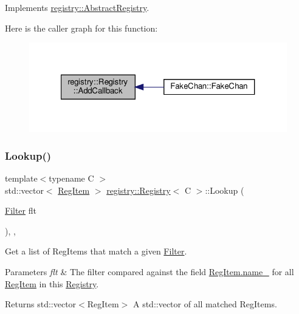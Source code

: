 Implements \hyperlink{classregistry_1_1AbstractRegistry_a83f61ca483c22185ddf43653ca65a8ef}{registry\+::\+Abstract\+Registry}.

Here is the caller graph for this function\+:\nopagebreak
\begin{figure}[H]
\begin{center}
\leavevmode
\includegraphics[width=321pt]{classregistry_1_1Registry_aa59df03bcaccf9a9687dbedc4e36cf33_icgraph}
\end{center}
\end{figure}
\mbox{\label{classregistry_1_1Registry_a15423d8f77a60eb8de72b851d2d34318}} 
\subsubsection{\texorpdfstring{Lookup()}{Lookup()}}
{\footnotesize\ttfamily template$<$typename C $>$ \\
std\+::vector$<$ \hyperlink{classregistry_1_1RegItem}{Reg\+Item} $>$ \hyperlink{classregistry_1_1Registry}{registry\+::\+Registry}$<$ C $>$\+::Lookup (\begin{DoxyParamCaption}\item[{\hyperlink{classregistry_1_1Filter}{Filter}}]{flt }\end{DoxyParamCaption})\hspace{0.3cm}{\ttfamily [override]}, {\ttfamily [virtual]}, {\ttfamily [noexcept]}}



Get a list of Reg\+Items that match a given \hyperlink{classregistry_1_1Filter}{Filter}. 


\begin{DoxyParams}{Parameters}
{\em flt} & The filter compared against the field \hyperlink{classregistry_1_1RegItem_a6e5945a427995b5f881403cd155b2a22}{Reg\+Item.\+name\+\_\+} for all \hyperlink{classregistry_1_1RegItem}{Reg\+Item} in this \hyperlink{classregistry_1_1Registry}{Registry}. \\
\hline
\end{DoxyParams}
\begin{DoxyReturn}{Returns}
std\+::vector$<$\+Reg\+Item$>$ A std\+::vector of all matched Reg\+Items. 
\end{DoxyReturn}


